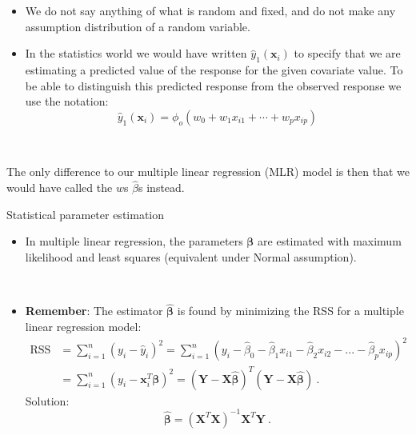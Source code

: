\documentclass[10pt,ignorenonframetext,]{beamer}
\providecommand{\tightlist}{%
  \setlength{\itemsep}{0pt}\setlength{\parskip}{0pt}}
\begin{document}
\begin{frame}

\begin{itemize}
\item
  We do not say anything of what is random and fixed, and do not make
  any assumption distribution of a random variable.
\item
  In the statistics world we would have written
  \(\hat{y}_1({\boldsymbol x}_i)\) to specify that we are estimating a
  predicted value of the response for the given covariate value. To be
  able to distinguish this predicted response from the observed response
  we use the notation:
  \[ \hat{y}_1({\boldsymbol x}_i)=\phi_o(w_0+w_1 x_{i1}+\cdots + w_p x_{ip})\]
\end{itemize}

\(~\)

The only difference to our multiple linear regression (MLR) model is
then that we would have called the \(w\)s \(\hat{\beta}\)s instead.

\end{frame}

\begin{frame}

\begin{block}{Statistical parameter estimation}

\vspace{2mm}

\begin{itemize}
\tightlist
\item
  In multiple linear regression, the parameters \(\boldsymbol\beta\) are
  estimated with maximum likelihood and least squares (equivalent under
  Normal assumption).
\end{itemize}

\(~\)

\begin{itemize}
\tightlist
\item
  \textbf{Remember}: The estimator \(\hat{\boldsymbol \beta}\) is found
  by minimizing the RSS for a multiple linear regression model: \[
  \begin{aligned} \text{RSS} &=\sum_{i=1}^n (y_i - \hat y_i)^2 = \sum_{i=1}^n (y_i - \hat \beta_0 - \hat \beta_1 x_{i1} - \hat \beta_2 x_{i2} -...-\hat \beta_p x_{ip} )^2 \\
  &= \sum_{i=1}^n (y_i-{\boldsymbol x}_i^T \boldsymbol \beta)^2=({\boldsymbol Y}-{\boldsymbol X}\hat{\boldsymbol{\beta}})^T({\boldsymbol Y}-{\boldsymbol X}\hat{\boldsymbol{\beta}}) \ .\end{aligned}
  \] Solution:
  \[ \hat{\boldsymbol\beta}=({\boldsymbol X}^T{\boldsymbol X})^{-1} {\boldsymbol X}^T {\boldsymbol Y} \ .\]
\end{itemize}

\end{block}

\end{frame}
\end{document}
